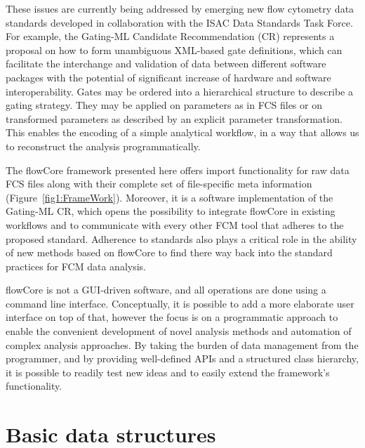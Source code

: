 \documentclass[12pt]{article}
\begin{document}
These issues are currently being addressed by emerging new flow
cytometry data standards developed in collaboration with the ISAC Data
Standards Task Force.  For example, the Gating-ML Candidate Recommendation (CR)
represents a proposal on how to form unambiguous XML-based gate
definitions, which can facilitate the interchange and validation of
data between different software packages with the potential of
significant increase of hardware and software interoperability. Gates
may be ordered into a hierarchical structure to describe a gating
strategy. They may be applied on parameters as in FCS files or on
transformed parameters as described by an explicit parameter
transformation. 
This enables the encoding of a simple analytical workflow, in a way
that allows us to reconstruct the analysis programmatically.

The flowCore framework presented here offers import functionality for
raw data FCS files along with their complete set of file-specific meta
information (Figure~\ref{fig1:FrameWork}). Moreover, it is a software
implementation of the Gating-ML CR, which opens the possibility to
integrate flowCore in existing workflows and to communicate with
every other FCM tool that adheres to the proposed
standard. Adherence to standards also plays a critical role in the ability
of new methods based on flowCore to find there way back into the
standard practices for FCM data analysis.

flowCore is not a GUI-driven software, and all operations are done
using a command line interface. Conceptually, it is possible to add a
more elaborate user interface on top of that, however the focus is on
a programmatic approach to enable the convenient development of novel
analysis methods and automation of complex analysis approaches. By taking the
burden of data management from the programmer, and by providing well-defined 
APIs and a structured class
hierarchy, it is possible to readily test new ideas and to easily
extend the framework's functionality. %



\section*{Basic data structures}
\end{document}
